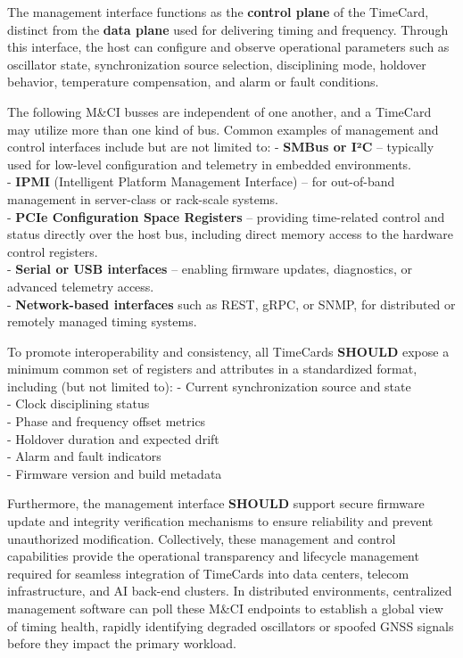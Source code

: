 The management interface functions as the \textbf{control plane} of the
TimeCard, distinct from the \textbf{data plane} used for delivering
timing and frequency. Through this interface, the host can configure and
observe operational parameters such as oscillator state, synchronization
source selection, disciplining mode, holdover behavior, temperature
compensation, and alarm or fault conditions.

The following M\&CI busses are independent of one another, and a
TimeCard may utilize more than one kind of bus. Common examples of
management and control interfaces include but are not limited to: -
\textbf{SMBus or I²C} -- typically used for low-level configuration and
telemetry in embedded environments.\\
- \textbf{IPMI} (Intelligent Platform Management Interface) -- for
out-of-band management in server-class or rack-scale systems.\\
- \textbf{PCIe Configuration Space Registers} -- providing time-related
control and status directly over the host bus, including direct memory
access to the hardware control registers.\\
- \textbf{Serial or USB interfaces} -- enabling firmware updates,
diagnostics, or advanced telemetry access.\\
- \textbf{Network-based interfaces} such as REST, gRPC, or SNMP, for
distributed or remotely managed timing systems.

To promote interoperability and consistency, all TimeCards
\textbf{SHOULD} expose a minimum common set of registers and attributes
in a standardized format, including (but not limited to): - Current
synchronization source and state\\
- Clock disciplining status\\
- Phase and frequency offset metrics\\
- Holdover duration and expected drift\\
- Alarm and fault indicators\\
- Firmware version and build metadata

Furthermore, the management interface \textbf{SHOULD} support secure
firmware update and integrity verification mechanisms to ensure
reliability and prevent unauthorized modification. Collectively, these
management and control capabilities provide the operational transparency
and lifecycle management required for seamless integration of TimeCards
into data centers, telecom infrastructure, and AI back-end clusters. In
distributed environments, centralized management software can poll these
M\&CI endpoints to establish a global view of timing health, rapidly
identifying degraded oscillators or spoofed GNSS signals before they
impact the primary workload.

